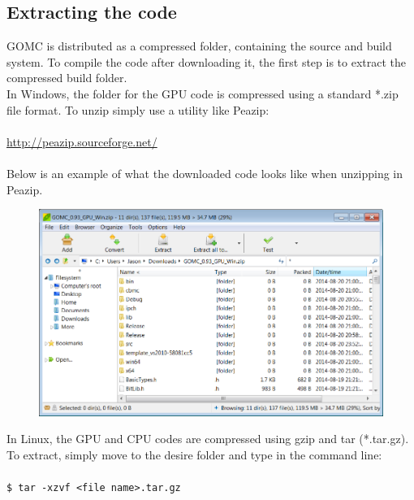 \subsection{Extracting the code}
GOMC is distributed as a compressed folder, containing the source and build system. To compile the code after downloading it, the first step is to extract the compressed build folder.\\
In Windows, the folder for the GPU code is compressed using a standard *.zip file format. To unzip simply use a utility like Peazip: \\\\
\url{http://peazip.sourceforge.net/}\\\\
Below is an example of what the downloaded code looks like when unzipping in Peazip.
\begin{figure}[H]
\centering
\includegraphics[scale=0.6]{images/peazip}
\end{figure}
In Linux, the GPU and CPU codes are compressed using gzip and tar (*.tar.gz).  To extract, simply move to the desire folder and type in the command line:\\\\
\texttt{\$ tar -xzvf <file name>.tar.gz}
